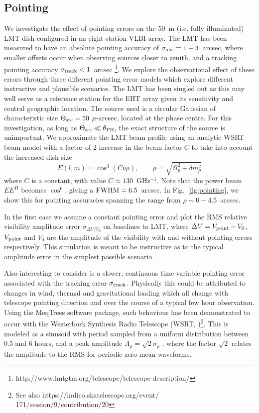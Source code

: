 \subsection{Pointing}
We investigate the effect of pointing errors on the 50~m (i.e. fully illuminated) LMT dish configured in an eight station VLBI array. The LMT has been measured to have an absolute pointing accuracy of $\sigma_{\rm abs} = 1-3$~arcsec, where smaller offsets occur when observing sources closer to zenith, and a tracking pointing accuracy $\sigma_{\rm track} < 1$~arcsec \footnote{http://www.lmtgtm.org/telescope/telescope-description/}. We explore the observational effect of these errors through three different pointing error models which explore different instructive and plausible scenarios. The LMT has been singled out as this may well serve as a reference station for the EHT array given its sensitivity and central geographic location. The source used is a circular Gaussian of characteristic size $\Theta_{\rm src}=50$ $\mu$-arcsec, located at the phase centre. For this investigation, as long as $\Theta_{\rm src} \ll \theta_{\rm PB}$, the exact structure of the source is unimportant. We approximate the LMT beam profile using an analytic WSRT beam model \citep{Popping_2008} with a factor of 2 increase in the beam factor $C$ to take into account the increased dish size
\begin{equation}
E(l, m) = \cos^3(C\nu \rho),\qquad   \rho = \sqrt{\delta l_p^2 + \delta m_p^2}
\end{equation}
where $C$ is a constant, with value $C \approx 130$~GHz$^{-1}$. Note that the power beam $EE^H$ becomes $\cos^6$, giving a $\rm{FWHM} = 6.5 $~arcsec. In Fig.~\ref{fig:pointing}, we show this for pointing accuracies spanning the range from $\rho \sim 0-4.5$~arcsec. 

In the first case we assume a constant pointing error and plot the RMS relative visibility amplitude error $\sigma_{\Delta V/V_0}$ on baselines to LMT, where $\Delta V = V_{\rm point} - V_{0}$, $V_{\rm point}$ and $V_{0}$ are the amplitude of the visibility with and without pointing errors respectively. This simulation is meant to be instructive as to the typical amplitude error in the simplest possible scenario.


Also interesting to consider is a slower, continuous time-variable pointing error associated with the tracking error $\sigma_{\rm track}$. Physically this could be attributed to changes in wind, thermal and gravitational loading which all change with telescope pointing direction and over the course of a typical few hour observation. Using the MeqTrees software package, such behaviour has been demonstrated to occur with the Westerbork Synthesis Radio Telescope (WSRT, \cite{Smirnov_2011c})\footnote{See also https://indico.skatelescope.org/event/\\171/session/9/contribution/20}. This is modeled as a sinusoid with period sampled from a uniform distribution between 0.5 and 6 hours, and a peak amplitude $A_{\rho} = \sqrt{2} \sigma_{\rho}$ , where the factor $\sqrt{2}$ relates the amplitude to the RMS for periodic zero mean waveforms. 


